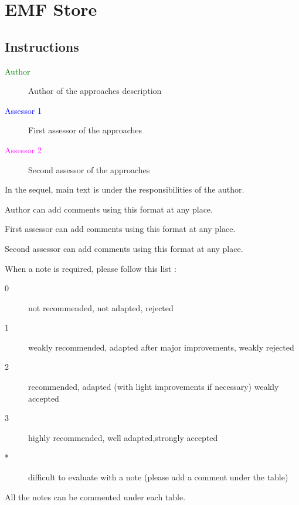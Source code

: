 \chapter{EMF Store}
\label{sec:emf store}

\section{Instructions}

\begin{description}
\item[\textcolor{green}{Author}] Author of the approaches description  
\item[\textcolor{blue}{Assessor 1}] First assessor of the approaches 
\item[\textcolor{magenta}{Assessor 2}] Second assessor of the approaches 
\end{description}

In the sequel, main text is under the responsibilities of the author.

\begin{author_comment}
Author can add comments using this format at any place.
\end{author_comment}

\begin{assessor1}
First assessor can add comments using this format at any place.
\end{assessor1}

\begin{assessor2}
Second assessor can add comments using this format at any place.
\end{assessor2}

When a note is required, please follow this list :
\begin{description}
\item[0] not recommended, not adapted, rejected
\item[1] weakly recommended, adapted after major improvements, weakly rejected
\item[2] recommended, adapted (with light improvements if necessary)  weakly accepted
\item[3] highly recommended, well adapted,strongly accepted
\item[*] difficult to evaluate with a note (please add a comment under the table)
\end{description}

All the notes can be commented under each table.

